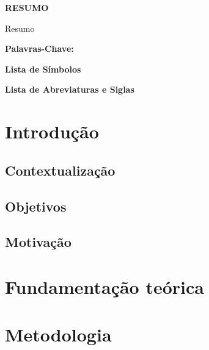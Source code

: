 \documentclass[a4paper,12pt]{article}
\begin{document}
\newpage
\thispagestyle{empty}
\begin{center}
    \large
    \textbf{RESUMO}
\end{center}
Resumo

\vspace{1cm}
\noindent\textbf{Palavras-Chave:}

\newpage
\thispagestyle{empty}
\begin{flushleft}
\Large
\textbf{Lista de Símbolos}
\end{flushleft}



\newpage
\thispagestyle{empty}
\begin{flushleft}
\Large
\textbf{Lista de Abreviaturas e Siglas}
\end{flushleft}

\newpage
\onehalfspacing
\thispagestyle{empty}
\listoffigures

\newpage
\onehalfspacing
\thispagestyle{empty}
\lstlistoflistings

\newpage
\thispagestyle{empty}
\tableofcontents

\newpage
\onehalfspacing
\section{Introdução}
    \subsection{Contextualização}

    \subsection{Objetivos}
    
    \subsection{Motivação}

    \newpage

\section{Fundamentação teórica}

\newpage
\section{Metodologia}
\end{document}
